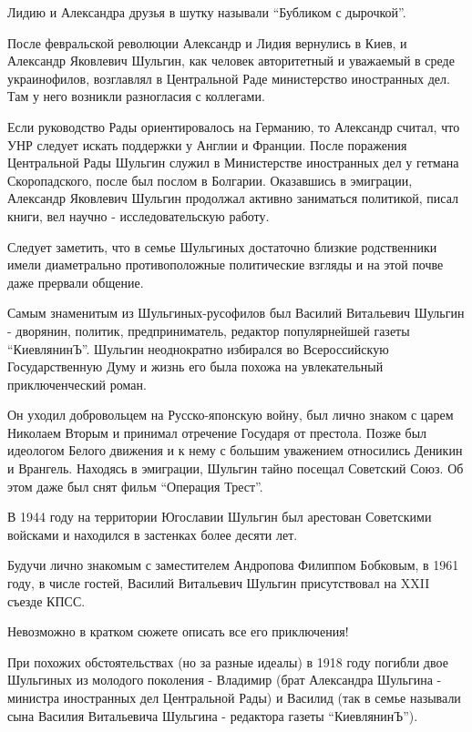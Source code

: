 Лидию и Александра друзья в шутку называли \enquote{Бубликом с дырочкой}.



После февральской революции Александр и Лидия вернулись в Киев, и Александр
Яковлевич Шульгин, как человек авторитетный и уважаемый в среде украинофилов,
возглавлял в Центральной Раде министерство иностранных дел. Там у него возникли
разногласия с коллегами. 

Если руководство Рады ориентировалось на Германию, то Александр считал, что УНР
следует искать поддержки у Англии и Франции. После поражения Центральной Рады
Шульгин служил в Министерстве иностранных дел у гетмана Скоропадского, после
был послом в Болгарии. Оказавшись в эмиграции, Александр Яковлевич Шульгин
продолжал активно заниматься политикой, писал книги, вел научно -
исследовательскую работу.


Следует заметить, что в семье Шульгиных достаточно близкие родственники имели
диаметрально противоположные политические взгляды и на этой почве даже прервали
общение.

Самым знаменитым из Шульгиных-русофилов был Василий Витальевич Шульгин -
дворянин, политик, предприниматель, редактор популярнейшей газеты \enquote{КиевлянинЪ}.
Шульгин неоднократно избирался во Всероссийскую Государственную Думу и жизнь
его была похожа на увлекательный приключенческий роман. 

Он уходил добровольцем на Русско-японскую войну,  был лично знаком с царем
Николаем Вторым и принимал отречение Государя от престола. Позже был идеологом
Белого движения и к нему с большим уважением относились Деникин и Врангель.
Находясь в эмиграции, Шульгин тайно посещал Советский Союз. Об этом даже был
снят фильм \enquote{Операция Трест}.

В 1944 году на территории Югославии Шульгин был арестован Советскими войсками и
находился в застенках более десяти лет.

Будучи лично знакомым с заместителем Андропова Филиппом Бобковым, в 1961 году,
в числе гостей, Василий Витальевич Шульгин присутствовал на XXII съезде КПСС. 

Невозможно в кратком сюжете описать все его приключения! 


При похожих обстоятельствах (но за разные идеалы) в 1918 году погибли двое
Шульгиных из молодого поколения - Владимир (брат Александра Шульгина - министра
иностранных дел Центральной Рады) и Василид (так в семье называли сына Василия
Витальевича Шульгина - редактора газеты \enquote{КиевлянинЪ}).

